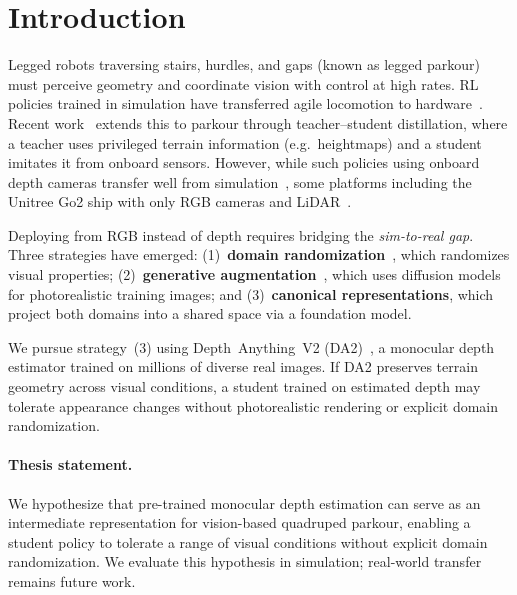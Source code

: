 \section{Introduction}
\label{sec:intro}

Legged robots traversing stairs, hurdles, and gaps (known as legged parkour) must perceive
geometry and coordinate vision with control at high rates.  RL
policies trained in simulation have transferred agile locomotion to
hardware~\citep{hwangbo2019learning, lee2020learning, rudin2022learning}.
Recent work~\citep{zhuang2023robot, cheng2023parkour, hoeller2024anymal,
	chane2025soloparkour} extends this to parkour through teacher--student
distillation, where a teacher uses privileged terrain information (e.g.\ heightmaps) and
a student imitates it from onboard sensors. However, while such policies using onboard depth cameras transfer well from simulation~\citep{miki2022learning,
	agarwal2023legged}, some platforms including the Unitree Go2 ship with only
RGB cameras and LiDAR~\citep{unitreego2}.

Deploying from RGB instead of depth requires bridging the
\emph{sim-to-real gap}.  Three strategies have emerged:
(1)~\textbf{domain randomization}~\citep{tobin2017domain}, which
randomizes visual properties;
(2)~\textbf{generative augmentation}~\citep{yu2024lucidsim}, which
uses diffusion models for photorealistic training images; and
(3)~\textbf{canonical representations}, which project both domains
into a shared space via a foundation model.

We pursue strategy~(3) using Depth~Anything~V2
(DA2)~\citep{yang2024depth}, a monocular depth estimator trained on
millions of diverse real images.  If DA2 preserves terrain geometry
across visual conditions, a student trained on estimated depth may
tolerate appearance changes without photorealistic rendering or
explicit domain randomization.

\paragraph{Thesis statement.}
We hypothesize that pre-trained monocular depth estimation can serve
as an intermediate representation for vision-based quadruped parkour,
enabling a student policy to tolerate a range of visual conditions
without explicit domain randomization.  We evaluate this hypothesis
in simulation; real-world transfer remains future work.

